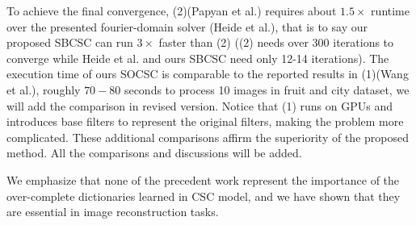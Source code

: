 \documentclass[10pt,twocolumn,letterpaper]{article}
\begin{document}
To achieve the final convergence, (2)(Papyan et al.) requires about $1.5 \times$ runtime over the presented fourier-domain solver (Heide et al.), that is to say our proposed SBCSC can run $3 \times$ faster than (2) ((2) needs over 300 iterations to converge while Heide et al. and ours SBCSC need only 12-14 iterations). The execution time of ours SOCSC is comparable to the reported results in (1)(Wang et al.), roughly $70-80$ seconds to process 10 images in fruit and city dataset, we will add the comparison in revised version. Notice that (1) runs on GPUs and introduces base filters to represent the original filters, making the problem more complicated. These additional comparisons affirm the superiority of the proposed method. All the comparisons and discussions will be added.

We emphasize that none of the precedent work represent the importance of the over-complete dictionaries learned in CSC model, and we have shown that they are essential in image reconstruction tasks.

%
%
\end{document}
